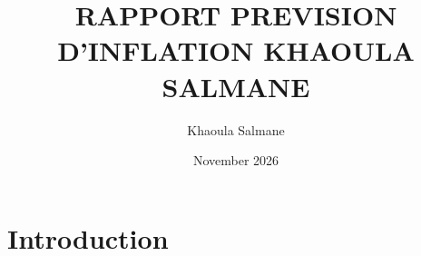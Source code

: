 \documentclass{article}
\title{RAPPORT PREVISION D'INFLATION KHAOULA SALMANE}
\author{Khaoula Salmane}
\date{November 2026}
\begin{document}
\maketitle

\section{Introduction}
\end{document}
